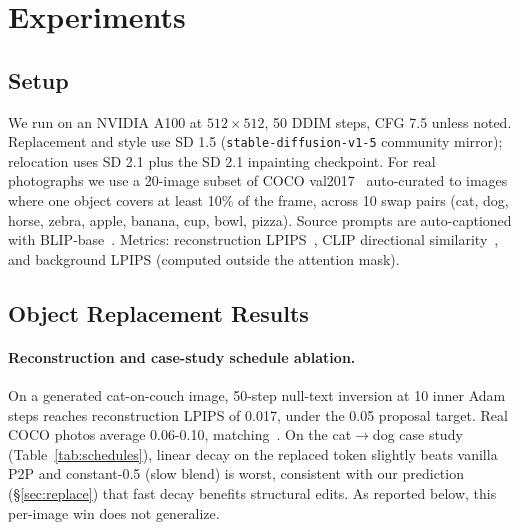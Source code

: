 \documentclass[10pt,twocolumn,letterpaper]{article}
\begin{document}
\section{Experiments}
\label{sec:experiments}

\subsection{Setup}
\label{sec:setup}

We run on an NVIDIA A100 at $512 \times 512$, 50 DDIM steps, CFG 7.5 unless noted. Replacement and style use SD 1.5 (\texttt{stable-diffusion-v1-5} community mirror); relocation uses SD 2.1 plus the SD 2.1 inpainting checkpoint. For real photographs we use a 20-image subset of COCO val2017~\cite{lin2014coco} auto-curated to images where one object covers at least 10\% of the frame, across 10 swap pairs (cat, dog, horse, zebra, apple, banana, cup, bowl, pizza). Source prompts are auto-captioned with BLIP-base~\cite{li2022blip}. Metrics: reconstruction LPIPS~\cite{zhang2018lpips}, CLIP directional similarity~\cite{gal2022stylegannada}, and background LPIPS (computed outside the attention mask).

\subsection{Object Replacement Results}
\label{sec:exp:repl}

\paragraph{Reconstruction and case-study schedule ablation.}
On a generated cat-on-couch image, 50-step null-text inversion at 10 inner Adam steps reaches reconstruction LPIPS of 0.017, under the 0.05 proposal target. Real COCO photos average 0.06-0.10, matching~\cite{mokady2022nullinv}. On the cat$\to$dog case study (Table~\ref{tab:schedules}), linear decay on the replaced token slightly beats vanilla P2P and constant-0.5 (slow blend) is worst, consistent with our prediction (\S\ref{sec:replace}) that fast decay benefits structural edits. As reported below, this per-image win does not generalize.
\end{document}
